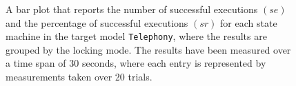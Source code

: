 \begin{figure}[h!]
\centering
\begin{minipage}{1\textwidth}
  \centering
  \makebox[\textwidth][c]{ %
        \resizebox{1.19\textwidth}{!}{ %
            
        }%
    }%
\end{minipage}
\caption{A bar plot that reports the number of successful executions $(se)$ and the percentage of successful executions $(sr)$ for each state machine in the target model \texttt{Telephony}, where the results are grouped by the locking mode. The results have been measured over a time span of 30 seconds, where each entry is represented by measurements taken over 20 trials.}
\label{figure:locking_mode_state_machine_transition_frequency_comparison_telephony_random_det}
\end{figure}